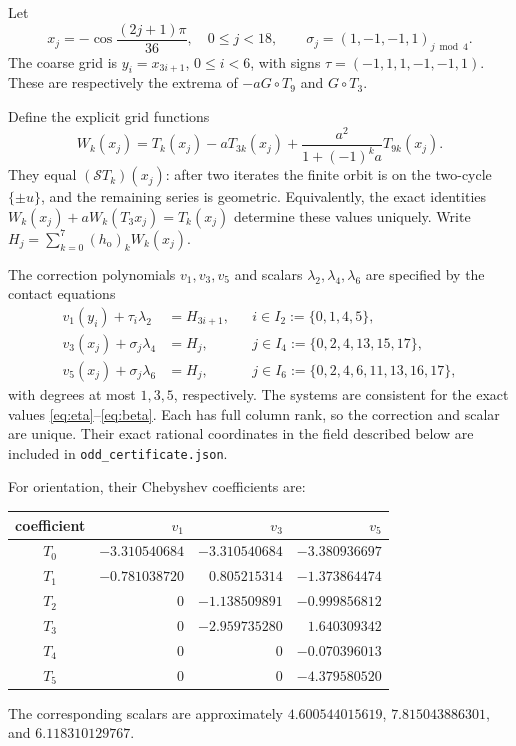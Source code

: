 \documentclass[11pt]{article}
\theoremstyle{remark}\newtheorem{remark}[theorem]{Remark}
\begin{document}
Let
\[
 x_j=-\cos\frac{(2j+1)\pi}{36},\quad0\le j<18,\qquad
 \sigma_j=(1,-1,-1,1)_{j\bmod4}.
\]
The coarse grid is $y_i=x_{3i+1}$, $0\le i<6$, with signs
$\tau=(-1,1,1,-1,-1,1)$. These are respectively the extrema of
$-aG\circ T_9$ and $G\circ T_3$.

Define the explicit grid functions
\[
 W_k(x_j)=T_k(x_j)-aT_{3k}(x_j)
        +\frac{a^2}{1+(-1)^ka}T_{9k}(x_j).
\]
They equal $(\mathcal S T_k)(x_j)$: after two iterates the finite orbit
is on the two-cycle $\{\pm u\}$, and the remaining series is geometric.
Equivalently, the exact identities
$W_k(x_j)+aW_k(T_3x_j)=T_k(x_j)$ determine these values uniquely.
Write $H_j=\sum_{k=0}^7(h_{\mathrm{o}})_k W_k(x_j)$.

The correction polynomials $v_1,v_3,v_5$ and scalars
$\lambda_2,\lambda_4,\lambda_6$ are specified by the contact equations
\begin{align*}
 v_1(y_i)+\tau_i\lambda_2&=H_{3i+1},
       &&i\in I_2:=\{0,1,4,5\},\\
 v_3(x_j)+\sigma_j\lambda_4&=H_j,
       &&j\in I_4:=\{0,2,4,13,15,17\},\\
 v_5(x_j)+\sigma_j\lambda_6&=H_j,
       &&j\in I_6:=\{0,2,4,6,11,13,16,17\},
\end{align*}
with degrees at most $1,3,5$, respectively. The systems are consistent
for the exact values \eqref{eq:eta}--\eqref{eq:beta}. Each has full column
rank, so the correction and scalar are unique. Their exact rational
coordinates in the field described below are included in
\texttt{odd\_certificate.json}.

For orientation, their Chebyshev coefficients are:
\begin{center}\small
\begin{tabular}{c r r r}
\toprule
coefficient & $v_1$ & $v_3$ & $v_5$\\\midrule
$T_0$&$-3.310540684$&$-3.310540684$&$-3.380936697$\\
$T_1$&$-0.781038720$&$ 0.805215314$&$-1.373864474$\\
$T_2$&$0$&$-1.138509891$&$-0.999856812$\\
$T_3$&$0$&$-2.959735280$&$ 1.640309342$\\
$T_4$&$0$&$0$&$-0.070396013$\\
$T_5$&$0$&$0$&$-4.379580520$\\\bottomrule
\end{tabular}
\end{center}
The corresponding scalars are approximately
$4.600544015619$, $7.815043886301$, and $6.118310129767$.
\end{document}
